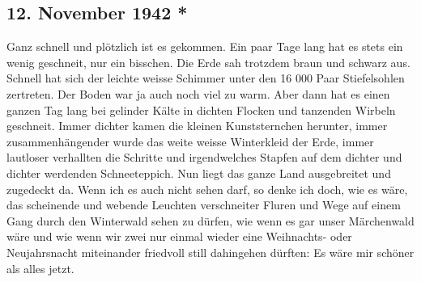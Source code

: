 \subsection{12. November 1942 *}

Ganz schnell und pl\"{o}tzlich ist es gekommen.
Ein paar Tage lang hat es stets ein wenig geschneit, nur ein bisschen.
Die Erde sah trotzdem braun und schwarz aus.
Schnell hat sich der leichte weisse Schimmer unter den 16 000 Paar Stiefelsohlen zertreten.
Der Boden war ja auch noch viel zu warm.
Aber dann hat es einen ganzen Tag lang bei gelinder K\"{a}lte in dichten Flocken und tanzenden Wirbeln geschneit.
Immer dichter kamen die kleinen Kunststernchen herunter, immer zusammenh\"{a}ngender wurde das weite weisse Winterkleid der Erde, immer lautloser verhallten die Schritte und irgendwelches Stapfen auf dem dichter und dichter werdenden Schneeteppich.
Nun liegt das ganze Land ausgebreitet und zugedeckt da.
Wenn ich es auch nicht sehen darf, so denke ich doch, wie es w\"{a}re, das scheinende und webende Leuchten verschneiter Fluren und Wege auf einem Gang durch den Winterwald sehen zu d\"{u}rfen, wie wenn es gar unser M\"{a}rchenwald w\"{a}re und wie wenn wir zwei nur einmal wieder eine Weihnachts- oder Neujahrsnacht miteinander friedvoll still dahingehen d\"{u}rften: Es w\"{a}re mir sch\"{o}ner als alles jetzt.

\clearpage
